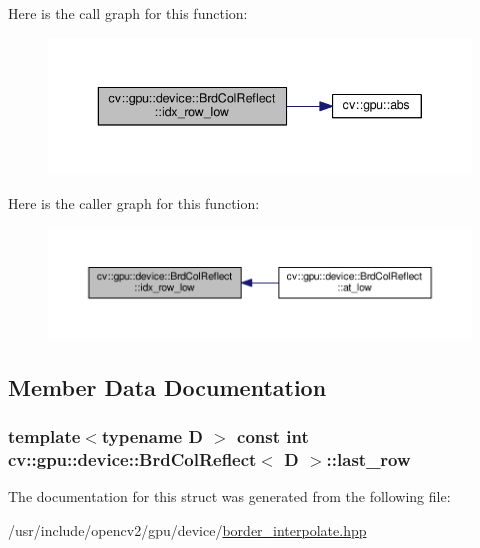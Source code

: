 Here is the call graph for this function\-:\nopagebreak
\begin{figure}[H]
\begin{center}
\leavevmode
\includegraphics[width=340pt]{structcv_1_1gpu_1_1device_1_1BrdColReflect_af169bd91a37d5844199d2dcd7f8a4030_cgraph}
\end{center}
\end{figure}




Here is the caller graph for this function\-:\nopagebreak
\begin{figure}[H]
\begin{center}
\leavevmode
\includegraphics[width=350pt]{structcv_1_1gpu_1_1device_1_1BrdColReflect_af169bd91a37d5844199d2dcd7f8a4030_icgraph}
\end{center}
\end{figure}




\subsection{Member Data Documentation}
\hypertarget{structcv_1_1gpu_1_1device_1_1BrdColReflect_a0a449c0dd186ae97a96ada5e31e7f335}{
\subsubsection[{last\-\_\-row}]{\setlength{\rightskip}{0pt plus 5cm}template$<$typename D $>$ const int {\bf cv\-::gpu\-::device\-::\-Brd\-Col\-Reflect}$<$ D $>$\-::last\-\_\-row}}\label{structcv_1_1gpu_1_1device_1_1BrdColReflect_a0a449c0dd186ae97a96ada5e31e7f335}


The documentation for this struct was generated from the following file\-:\begin{DoxyCompactItemize}
\item 
/usr/include/opencv2/gpu/device/\hyperlink{border__interpolate_8hpp}{border\-\_\-interpolate.\-hpp}\end{DoxyCompactItemize}
